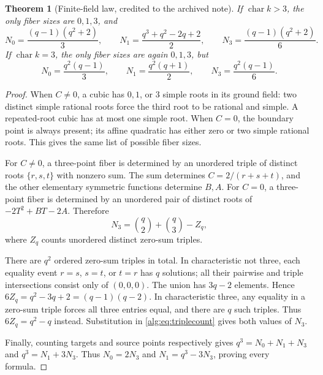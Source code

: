 \documentclass[11pt]{article}
\numberwithin{equation}{section}
\newtheorem{theorem}{Theorem}[section]
\theoremstyle{plain}
\theoremstyle{plain}
\theoremstyle{plain}
\theoremstyle{definition}
\theoremstyle{definition}
\theoremstyle{definition}
\theoremstyle{remark}
\begin{document}
\begin{theorem}[Finite-field law, credited to the archived note]\label{alg:thm:finitefields}
If $\operatorname{char}k>3$, the only fiber sizes are $0,1,3$, and
\begin{equation}\label{alg:eq:fflaw}
 N_0=\frac{(q-1)(q^2+2)}3,\qquad
 N_1=\frac{q^3+q^2-2q+2}2,\qquad
 N_3=\frac{(q-1)(q^2+2)}6.
\end{equation}
If $\operatorname{char}k=3$, the only fiber sizes are again $0,1,3$, but
\begin{equation}\label{alg:eq:fflaw3}
 N_0=\frac{q^2(q-1)}3,\qquad
 N_1=\frac{q^2(q+1)}2,\qquad
 N_3=\frac{q^2(q-1)}6.
\end{equation}
\end{theorem}
\begin{proof}
When $C\ne0$, a cubic has $0,1$, or $3$ simple roots in its ground field:
two distinct simple rational roots force the third root to be rational
and simple. A repeated-root cubic has at most one simple root.
When $C=0$, the boundary point is always present; its affine quadratic
has either zero or two simple rational roots. This gives the same list
of possible fiber sizes.

For $C\ne0$, a three-point fiber is determined by an unordered triple
of distinct roots $\{r,s,t\}$ with nonzero sum. The sum determines
$C=2/(r+s+t)$, and the other elementary symmetric functions determine
$B,A$. For $C=0$, a three-point fiber is determined by an unordered
pair of distinct roots of $-2T^2+BT-2A$. Therefore
\begin{equation}\label{alg:eq:triplecount}
 N_3=\binom q2+\binom q3-Z_q,
\end{equation}
where $Z_q$ counts unordered distinct zero-sum triples.

There are $q^2$ ordered zero-sum triples in total. In characteristic
not three, each equality event $r=s$, $s=t$, or $t=r$ has $q$ solutions;
all their pairwise and triple intersections consist only of $(0,0,0)$.
The union has $3q-2$ elements. Hence
$6Z_q=q^2-3q+2=(q-1)(q-2)$.
In characteristic three, any equality in a zero-sum triple forces all
three entries equal, and there are $q$ such triples. Thus
$6Z_q=q^2-q$ instead. Substitution in \eqref{alg:eq:triplecount} gives
both values of $N_3$.

Finally, counting targets and source points respectively gives
$q^3=N_0+N_1+N_3$ and $q^3=N_1+3N_3$. Thus $N_0=2N_3$ and
$N_1=q^3-3N_3$, proving every formula.
\end{proof}
\end{document}
